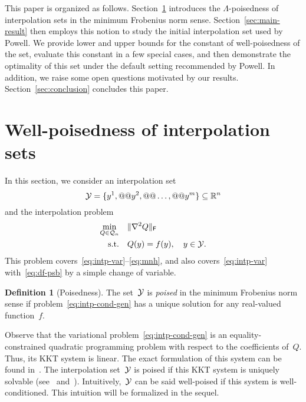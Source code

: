 \documentclass{article}
\makeatletter
\newcounter{cite}
\numberwithin{equation}{section}
\theoremstyle{definition}
\newtheorem{definition}{Definition}[section]
\theoremstyle{plain}
\theoremstyle{remark}
\newcommand*{\norm}[2][]{#1\lVert#2#1\rVert}
\newcommand*{\set}[2][]{#1\{#2#1\}}
\newcommand*{\obj}{f}
\newcommand*{\R}{\mathbb{R}}
\newcommand*{\xpt}[1][]{\mathcal{Y}\ifblank{#1}{}{^{@#1}}}
\newcommand*{\qpoly}{\mathcal{Q}_n}
\makeatother
\begin{document}
This paper is organized as follows.
Section~\ref{sec:well-poisedness} introduces the $\Lambda$-poisedness of interpolation sets in the minimum Frobenius norm sense.
Section~\ref{sec:main-result} then employs this notion to study the initial interpolation set used by Powell.
We provide lower and upper bounds for the constant of well-poisedness of the set, evaluate this constant in a few special cases, and then demonstrate the optimality of this set under the default setting recommended by Powell.
In addition, we raise some open questions motivated by our results.
Section~\ref{sec:conclusion} concludes this paper.

\section{Well-poisedness of interpolation sets}
\label{sec:well-poisedness}

In this section, we consider an interpolation set
\begin{equation*}
    \xpt = \set{y^1, @@ y^2, @@ \dots, @@ y^m} \subseteq \R^n
\end{equation*}
and the interpolation problem
\begin{equation}
    \label{eq:intp-cond-gen}
    \begin{aligned}
        \min_{Q \in \qpoly} & \quad \norm{\nabla^2 Q}_\textsf{F}\\
        \text{s.t.}         & \quad Q(y) = \obj(y), \quad y \in \xpt.
    \end{aligned}
\end{equation}
This problem covers~\eqref{eq:intp-var}--\eqref{eq:mnh}, and also covers~\eqref{eq:intp-var} with~\eqref{eq:df-psb} by a simple change of variable.

\begin{definition}[Poisedness]
    The set~$\xpt$ is \emph{poised} in the minimum Frobenius norm sense if problem~\eqref{eq:intp-cond-gen} has a unique solution for any real-valued function~$\obj$.
\end{definition}

Observe that the variational problem~\eqref{eq:intp-cond-gen} is an equality-constrained quadratic programming problem with respect to the coefficients of~$Q$.
Thus, its KKT system is linear.
The exact formulation of this system can be found in~\cite{Powell_2004a,Powell_2004b}.
The interpolation set~$\xpt$ is poised if this KKT system is uniquely solvable (see~\cite[\S~2]{Powell_2004a} and~\cite[\S~5.3]{Conn_Scheinberg_Vicente_2009}).
Intuitively,~$\xpt$ can be said well-poised if this system is well-conditioned.
This intuition will be formalized in the sequel.
\end{document}
